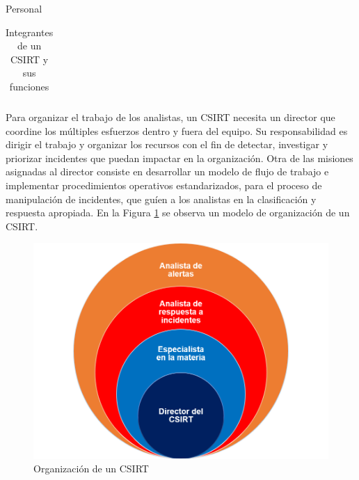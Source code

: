 \begin{section}{Personal}
\begin{table}
\begin{tabular}{ | m{10em} | m{16em}| m{11em} | }
            \hline %
        \end{tabular}
        \caption{Integrantes de un CSIRT y sus funciones}
        \label{table:1}
    \end{table}
    \FloatBarrier %
        Para organizar el trabajo de los analistas, un CSIRT necesita un director que coordine los múltiples esfuerzos dentro y fuera del equipo. Su responsabilidad es dirigir el trabajo y organizar los recursos con el fin de detectar, investigar y priorizar incidentes que puedan impactar en la organización. Otra de las misiones asignadas al director consiste en desarrollar un modelo de flujo de trabajo e implementar procedimientos operativos estandarizados, para el proceso de manipulación de incidentes, que guíen a los analistas en la clasificación y respuesta apropiada.
        En la Figura \ref{fig:org_csirt} se observa un modelo de organización de un CSIRT.
        
        \begin{figure}[H]
            \centering
            \includegraphics[width=1\textwidth]{./marco_teorico_imagenes/figura_2_org_csirt.png}
            \caption{Organización de un CSIRT}
            \label{fig:org_csirt}
        \end{figure}

   \end{section}
   
